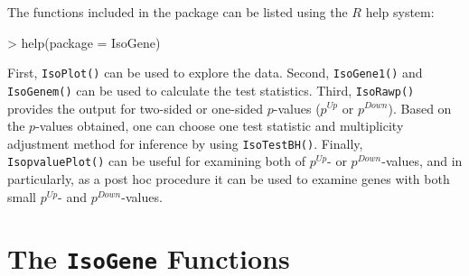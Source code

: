 \documentclass[10pt]{article}
\begin{document}
The functions included in the package can be listed using the $R$
help system:

\begin{Schunk}
\begin{Sinput}
> help(package = IsoGene)
\end{Sinput}
\end{Schunk}






First, \texttt{IsoPlot()} can be used to
explore the data. Second, \texttt{IsoGene1()} and
\texttt{IsoGenem()} can be used to calculate the test statistics.
Third, \texttt{IsoRawp()} provides the output for two-sided or
one-sided $p$-values ($p^{Up}$ or $p^{Down}$). Based on the
$p$-values obtained, one can choose one test statistic and
multiplicity adjustment method for inference by using
\texttt{IsoTestBH()}. Finally, \texttt{IsopvaluePlot()} can be
useful for examining both of $p^{Up}$- or $p^{Down}$-values, and in
particularly, as a post hoc procedure it can be used to examine
genes with both small $p^{Up}$- and $p^{Down}$-values.


\section{The \texttt{IsoGene} Functions}
\end{document}
